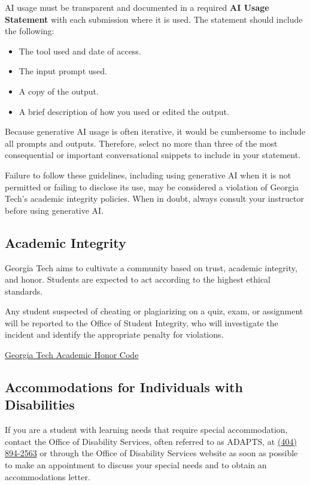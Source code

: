 \documentclass[11pt]{article}
\begin{document}
AI usage must be transparent and documented in a required \textbf{AI Usage Statement} with each submission where it is used. The statement should include the following:

\begin{itemize}[nosep]
    \item The tool used and date of access.
    \item The input prompt used.
    \item A copy of the output.
    \item A brief description of how you used or edited the output.
\end{itemize}

Because generative AI usage is often iterative, it would be cumbersome to include all prompts and outputs. Therefore, select no more than three of the most consequential or important conversational snippets to include in your statement.

Failure to follow these guidelines, including using generative AI when it is not permitted or failing to disclose its use, may be considered a violation of Georgia Tech's academic integrity policies. When in doubt, always consult your instructor before using generative AI.

\subsection*{Academic Integrity}

Georgia Tech aims to cultivate a community based on trust, academic integrity, and honor. Students are expected to act according to the highest ethical standards.

Any student suspected of cheating or plagiarizing on a quiz, exam, or assignment will be reported to the Office of Student Integrity, who will investigate the incident and identify the appropriate penalty for violations.

\href{https://osi.gatech.edu/students/honor-code}{Georgia Tech Academic Honor Code}

\subsection*{Accommodations for Individuals with Disabilities}

If you are a student with learning needs that require special accommodation, contact the Office of Disability Services, often referred to as ADAPTS, at \href{tel:4048942563}{(404) 894-2563} or through the Office of Disability Services website as soon as possible to make an appointment to discuss your special needs and to obtain an accommodations letter.
\end{document}
